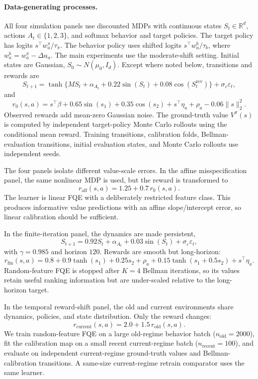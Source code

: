 \documentclass{article}
\theoremstyle{plain}
\theoremstyle{definition}
\theoremstyle{remark}
\begin{document}
\paragraph{Data-generating processes.}
All four simulation panels use discounted MDPs with continuous states
\(S_t\in\mathbb{R}^d\), actions \(A_t\in\{1,2,3\}\), and softmax behavior and
target policies. The target policy has logits \(s^\top w_a^\pi/\tau_\pi\). The
behavior policy uses shifted logits \(s^\top w_a^b/\tau_b\), where
\(w_a^b=w_a^\pi-\Delta u_a\). The main experiments use the moderate-shift
setting. Initial states are Gaussian, \(S_0\sim N(\mu_0,I_d)\). Except where
noted below, transitions and rewards are
\[
  S_{t+1}
  =
  \tanh\{M S_t+\alpha_{A_t}+0.22\sin(S_t)+0.08\cos(S_t^{\mathrm{rev}})\}
  + \sigma_\varepsilon \varepsilon_t ,
\]
and
\[
  r_0(s,a)
  =
  s^\top\beta
  +0.65\sin(s_1)
  +0.35\cos(s_2)
  +s^\top\eta_a
  +\rho_a
  -0.06\|s\|_2^2 .
\]
Observed rewards add mean-zero Gaussian noise. The ground-truth value \(V^\pi(s)\) is
computed by independent target-policy Monte Carlo rollouts using the conditional
mean reward. Training transitions, calibration folds, Bellman-evaluation
transitions, initial evaluation states, and Monte Carlo rollouts use independent
seeds.

The four panels isolate different value-scale errors. In the affine
misspecification panel, the same nonlinear MDP is used, but the reward is
transformed to
\[
  r_{\mathrm{aff}}(s,a)=1.25+0.7\,r_0(s,a).
\]
The learner is linear FQE with a deliberately restricted feature class. This
produces informative value predictions with an affine slope/intercept error, so
linear calibration should be sufficient.

In the finite-iteration panel, the dynamics are made persistent,
\[
  S_{t+1}=0.92S_t+\alpha_{A_t}+0.03\sin(S_t)+\sigma_\varepsilon\varepsilon_t,
\]
with \(\gamma=0.985\) and horizon \(120\). Rewards are smooth but long-horizon:
\[
  r_{\mathrm{fin}}(s,a)
  =
  0.8+0.9\tanh(s_1)+0.25s_2+\rho_a
  +0.15\tanh(s_1+0.5s_2)+s^\top\eta_a .
\]
Random-feature FQE is stopped after \(K=4\) Bellman iterations, so its values
retain useful ranking information but are under-scaled relative to the
long-horizon target.

In the temporal reward-shift panel, the old and current environments share
dynamics, policies, and state distribution. Only the reward changes:
\[
  r_{\mathrm{current}}(s,a)=2.0+1.5\,r_{\mathrm{old}}(s,a).
\]
We train random-feature FQE on a large old-regime behavior batch
(\(n_{\mathrm{old}}=2000\)), fit the calibration map on a small recent
current-regime batch (\(n_{\mathrm{recent}}=100\)), and evaluate on independent
current-regime ground-truth values and Bellman-calibration transitions. A same-size
current-regime retrain comparator uses the same learner.
\end{document}
